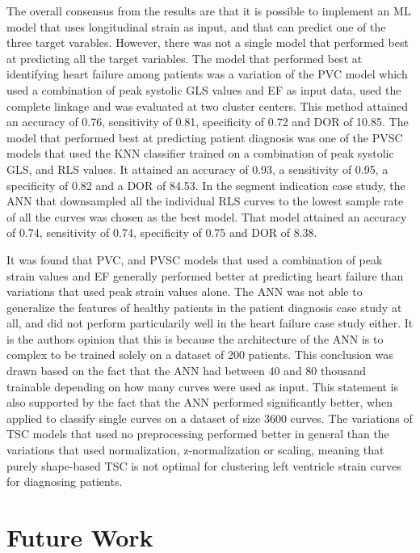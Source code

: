 The overall consensus from the results are that it is possible to implement an ML model that uses longitudinal strain as input, and that can predict one of the three target varables. However, there was not a single model that performed best at predicting all the target variables. The model that performed best at identifying heart failure among patients was a variation of the PVC model which used a combination of peak systolic GLS values and EF as input data, used the complete linkage and was evaluated at two cluster centers. This method attained an accuracy of 0.76, sensitivity of 0.81, specificity of 0.72 and DOR of 10.85. The model that performed best at predicting patient diagnosis was one of the PVSC models that used the KNN classifier trained on a combination of peak systolic GLS, and RLS values. It attained an accuracy of 0.93, a sensitivity of 0.95, a specificity of 0.82 and a DOR of 84.53.
In the segment indication case study, the ANN that downsampled all the individual RLS curves to the lowest sample rate of all the curves was chosen as the best model. That model attained an accuracy of 0.74, sensitivity of 0.74, specificity of 0.75 and DOR of 8.38. \bigskip

It was found that PVC, and PVSC models that used a combination of peak strain values and EF generally performed better at predicting heart failure than variations that used peak strain values alone. The ANN was not able to generalize the features of healthy patients in the patient diagnosis case study at all, and did not perform particularily well in the heart failure case study either. It is the authors opinion that this is because the architecture of the ANN is to complex to be trained solely on a dataset of 200 patients. This conclusion was drawn based on the fact that the ANN had between 40 and 80 thousand trainable depending on how many curves were used as input. This statement is also supported by the fact that the ANN performed significantly better, when applied to classify single curves on a dataset of size 3600 curves. The variations of TSC models that used no preprocessing performed better in general than the variations that used normalization, z-normalization or scaling, meaning that purely shape-based TSC is not optimal for clustering left ventricle strain curves for diagnosing patients.

\section{Future Work}

